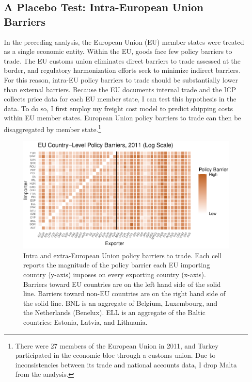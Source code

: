 \documentclass{puthesis}
\begin{document}
\subsection{A Placebo Test: Intra-European Union Barriers}

In the preceding analysis, the European Union (EU) member states were
treated as a single economic entity. Within the EU, goods face few
policy barriers to trade. The EU customs union eliminates direct
barriers to trade assessed at the border, and regulatory harmonization
efforts seek to minimize indirect barriers. For this reason, intra-EU
policy barriers to trade should be substantially lower than external
barriers. Because the EU documents internal trade and the ICP collects
price data for each EU member state, I can test this hypothesis in the
data. To do so, I first employ my freight cost model to predict shipping
costs within EU member states. European Union policy barriers to trade
can then be disaggregated by member state.\footnote{There were 27
  members of the European Union in 2011, and Turkey participated in the
  economic bloc through a customs union. Due to inconsistencies between
  its trade and national accounts data, I drop Malta from the analysis.}

\begin{figure}
\centering
\includegraphics{figure/hmEUD-1.pdf}
\caption{Intra and extra-European Union policy barriers to trade. Each
cell reports the magnitude of the policy barrier each EU importing
country (y-axis) imposes on every exporting country (x-axis). Barriers
toward EU countries are on the left hand side of the solid line.
Barriers toward non-EU countries are on the right hand side of the solid
line. BNL is an aggregate of Belgium, Luxembourg, and the Netherlands
(Benelux). ELL is an aggregate of the Baltic countries: Estonia, Latvia,
and Lithuania. \label{fig:hmEUD}}
\end{figure}
\end{document}
